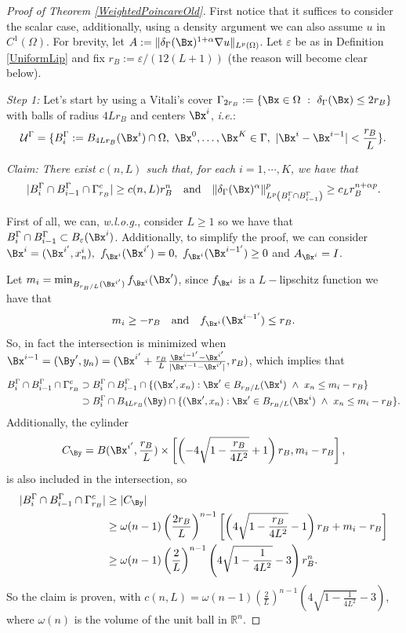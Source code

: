 \begin{proof}[Proof of Theorem \ref{WeightedPoincareOld}]
First notice that it suffices to consider the scalar case, additionally, using a density argument we can also assume $u$ in $C^1(\Omega)$. For brevity, let $A:=\|\delta_\GG(\Bx)^{1+\alpha} \nabla u\|_{L^p(\Omega)}$. Let $\varepsilon$ be as in Definition \ref{UniformLip} and fix $r_B:=\varepsilon /(12(L+1))$ (the reason will become clear below). 

\textit{Step 1:} Let's start by using a Vitali's cover $\Gamma_{2r_B} := \{\Bx\in \Omega\ :\ \delta_\GG(\Bx)\leq 2r_B\} $ with  balls of radius $4Lr_B$ and centers $\Bx^i$, \textit{i.e.}:
$$\mathcal{U}^\GG= \{ B^\GG_i := B_{4Lr_B}(\Bx^i)\cap \Omega,\ \Bx^0,\ldots, \Bx^K \in \GG,\ |\Bx^i-\Bx^{i-1}|< \frac{r_B}{L}\}.$$

\textit{Claim: There exist $c(n,L)$ such that, for each $i=1,\cdots, K$, we have that
$$|B^\GG_i\cap B_{i-1}^\GG\cap \GG^c_{r_B}|\geq c(n,L) r_B^n\quad \text{and}\quad \|\delta_\GG(\Bx)^\alpha\|^p_{L^p \left(B^\GG_{i}\cap B^\GG_{i-1}\right)}\geq c_L r_B^{n+\alpha p}. $$}

First of all, we can, \textit{w.l.o.g.}, consider $L\geq 1$ so we have that $B^\GG_i\cap B_{i-1}^\GG\subset B_\varepsilon(\Bx^i)$. Additionally, to simplify the proof, we can consider $\Bx^i=(\Bx^{i'},x^i_n),$ $f_{\Bx^i}(\Bx^{i'})=0,\ f_{\Bx^{i}}(\Bx^{i-1'})\geq 0$ and $A_{\Bx^i}=I$.

Let $m_i = \min_{B_{r_B/L}(\Bx^{i'})} f_{\Bx^i}(\Bx')$, since $f_{\Bx^i}$ is a $L-$lipschitz function we have that
$$m_i \geq - r_B\quad\text{and}\quad f_{\Bx^{i}}(\Bx^{i-1'})\leq r_B.$$
 So, in fact the intersection is minimized when  $\Bx^{i-1}=(\By',y_n)= (\Bx^{i'}+\frac{r_B}{L}\frac{\Bx^{i-1'}-\Bx^{i'}}{|\Bx^{i-1}-\Bx^{i'}|},r_B)$, which implies that
\begin{align*}
    B^\GG_i\cap B^\GG_{i-1}\cap\GG^c_{r_B}&\supset
     B^\GG_i\cap B^\GG_{i-1}\cap \{(\Bx',x_n): \Bx'\in B_{r_B/L}(\Bx^i)\ \wedge\  x_n\leq m_i-r_B\}\\&\supset
    B^\GG_i\cap B_{4Lr_B}(\By)\cap \{(\Bx',x_n): \Bx'\in B_{r_B/L}(\Bx^i)\ \wedge\  x_n\leq m_i-r_B\}.
\end{align*}
Additionally, the cylinder $$C_\By = B(\Bx^{i'},\frac{r_B}{L})\times \left[\left(-4\sqrt{1-\frac{r_B}{4L^2}}+1\right)r_B,m_i-r_B\right],$$ is  also included in the intersection, so
\begin{align*}
    |B^\GG_i\cap B_{i-1}^\GG\cap \GG^c_{r_B}|&\geq |C_\By|\\
    &\geq \omega(n-1)\left(\frac{2r_B}{L}\right)^{n-1}\left[\left(4\sqrt{1-\frac{r_B}{4L^2}}-1\right)r_B+m_i-r_B\right]\\
        & \geq \omega(n-1)\left(\frac{2}{L}\right)^{n-1}\left(4\sqrt{1-\frac{1}{4L^2}}-3\right)r_B^n. 
\end{align*}
So the claim is proven, with $c(n,L) =\omega(n-1)\left(\frac{2}{L}\right)^{n-1}\left(4\sqrt{1-\frac{1}{4L^2}}-3\right)$, where $\omega(n)$ is the volume of the unit ball in $\mathbb{R}^n$.



\end{proof}

